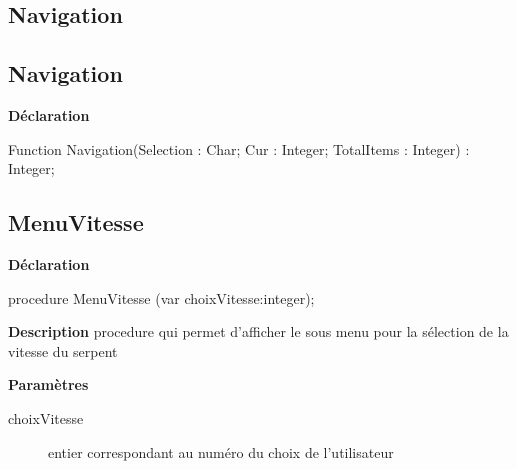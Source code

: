 \documentclass{report}
\newif\ifpdf
\begin{document}
\subsection*{\large{\textbf{Navigation}}\normalsize\hspace{1ex}\hrulefill}
\else
\subsection*{Navigation}
\fi
\label{LesMenus-Navigation}
\begin{list}{}{
\setlength{\itemindent}{0cm}
\setlength{\listparindent}{0cm}
\setlength{\leftmargin}{\evensidemargin}
\addtolength{\leftmargin}{\tmplength}
\settowidth{\labelsep}{X}
\addtolength{\leftmargin}{\labelsep}
\setlength{\labelwidth}{\tmplength}
}
\item[\textbf{Déclaration}\hfill]
\ifpdf
\begin{flushleft}
\fi
\begin{ttfamily}
Function Navigation(Selection : Char; Cur : Integer; TotalItems : Integer) : Integer;\end{ttfamily}

\ifpdf
\end{flushleft}
\fi

\end{list}
\ifpdf
\subsection*{\large{\textbf{MenuVitesse}}\normalsize\hspace{1ex}\hrulefill}
\else
\subsection*{MenuVitesse}
\fi
\label{LesMenus-MenuVitesse}
\begin{list}{}{
\setlength{\itemindent}{0cm}
\setlength{\listparindent}{0cm}
\setlength{\leftmargin}{\evensidemargin}
\addtolength{\leftmargin}{\tmplength}
\settowidth{\labelsep}{X}
\addtolength{\leftmargin}{\labelsep}
\setlength{\labelwidth}{\tmplength}
}
\item[\textbf{Déclaration}\hfill]
\ifpdf
\begin{flushleft}
\fi
\begin{ttfamily}
procedure MenuVitesse (var choixVitesse:integer);\end{ttfamily}

\ifpdf
\end{flushleft}
\fi

\par
\item[\textbf{Description}]
procedure qui permet d'afficher le sous menu pour la sélection de la vitesse du serpent \par
\item[\textbf{Paramètres}]
\begin{description}
\item[choixVitesse] entier correspondant au numéro du choix de l'utilisateur
\end{description}


\end{list}
\ifpdf
\end{document}

